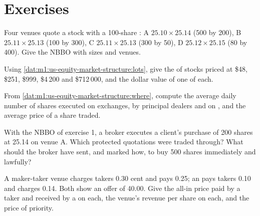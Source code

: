 \section{Exercises}

\begin{exercise}[$\star$]\label{exo:m1:us-equity-market-structure:1}
Four venues quote a stock with a 100-share : A $25.10 \times 25.14$
(500 by 200), B $25.11 \times 25.13$ (100 by 300), C $25.11 \times 25.13$ (300
by 50), D $25.12 \times 25.15$ (80 by 400). Give the NBBO with sizes and
venues.
\end{exercise}

\begin{exercise}[$\star$]\label{exo:m1:us-equity-market-structure:2}
Using \cref{dat:m1:us-equity-market-structure:lots}, give the  of
stocks priced at \$48, \$251, \$999, \$4\,200 and \$712\,000, and the dollar
value of one  of each.
\end{exercise}

\begin{exercise}[$\star$]\label{exo:m1:us-equity-market-structure:3}
From \cref{dat:m1:us-equity-market-structure:where}, compute the average
daily number of shares executed on exchanges, by principal dealers and on
, and the average price of a share traded.
\end{exercise}

\begin{exercise}[$\star\star$]\label{exo:m1:us-equity-market-structure:4}
With the NBBO of exercise 1, a broker executes a client's purchase of 200
shares at 25.14 on venue A. Which protected quotations were traded through?
What should the broker have sent, and marked how, to buy 500 shares
immediately and lawfully?
\end{exercise}

\begin{exercise}[$\star\star$]\label{exo:m1:us-equity-market-structure:5}
A maker-taker venue charges takers 0.30 cent and pays  0.25; an
 pays takers 0.10 and charges  0.14. Both show an offer
of 40.00. Give the all-in price paid by a taker and received by a  on
each, the venue's revenue per share on each, and the price of priority.
\end{exercise}


